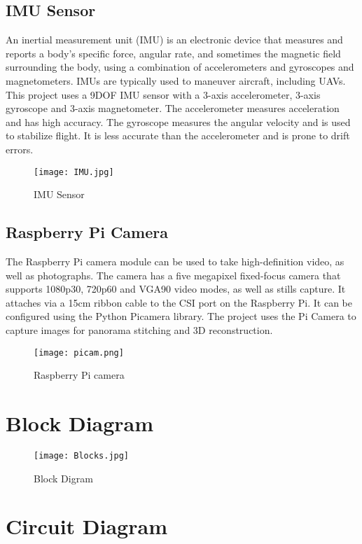 \subsection{IMU Sensor}
An inertial measurement unit (IMU) is an electronic device that measures and reports a body's specific force, angular rate, and sometimes the magnetic field surrounding the body, using a combination of accelerometers and gyroscopes and magnetometers. IMUs are typically used to maneuver aircraft, including UAVs. This project uses a 9DOF IMU sensor with a 3-axis accelerometer, 3-axis gyroscope and 3-axis magnetometer. The accelerometer measures acceleration and has high accuracy. The gyroscope measures the angular velocity and is used to stabilize flight. It is less accurate than the accelerometer and is prone to drift errors. 
\begin{figure}[H]
  \centering
  \texttt{[image: IMU.jpg]}
  \caption{IMU Sensor}
  \label{IMU Sensor}	
\end{figure}

\subsection{Raspberry Pi Camera}
The Raspberry Pi camera module can be used to take high-definition video, as well as photographs. The camera has a five megapixel fixed-focus camera that supports 1080p30, 720p60 and VGA90 video modes, as well as stills capture. It attaches via a 15cm ribbon cable to the CSI port on the Raspberry Pi. It can be configured using the Python Picamera library. The project uses the Pi Camera to capture images for panorama stitching and 3D reconstruction.
\begin{figure}[H]
  \centering
  \texttt{[image: picam.png]}
  \caption{Raspberry Pi camera}
  \label{RPi camera}	
\end{figure}

\section{Block Diagram}

\begin{figure}[H]
  \centering
  \texttt{[image: Blocks.jpg]}
  \caption{Block Digram}
  \label{block}	
\end{figure}


\section{Circuit Diagram}

